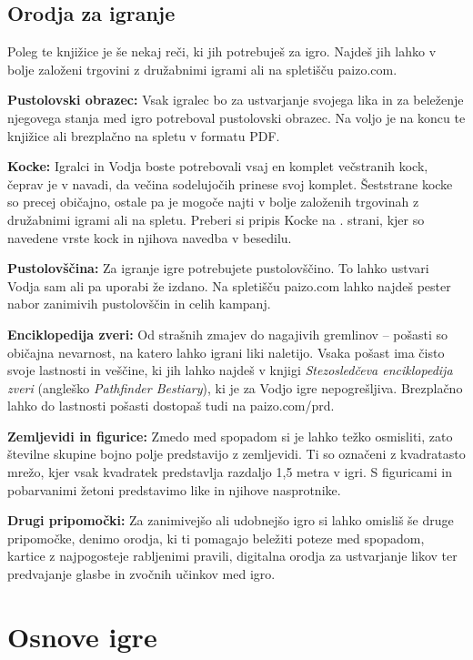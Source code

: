 \subsection{Orodja za igranje}

Poleg te knjižice je še nekaj reči, ki jih potrebuješ za igro. Najdeš jih lahko v bolje založeni trgovini z družabnimi igrami ali na spletišču paizo.com.

\textbf{Pustolovski obrazec:} Vsak igralec bo za ustvarjanje svojega lika in za beleženje njegovega stanja med igro potreboval pustolovski obrazec. Na voljo je na koncu te knjižice ali brezplačno na spletu v formatu PDF.

\textbf{Kocke:} Igralci in Vodja boste potrebovali vsaj en komplet večstranih kock, čeprav je v navadi, da večina sodelujočih prinese svoj komplet. Šeststrane kocke so precej običajno, ostale pa je mogoče najti v bolje založenih trgovinah z družabnimi igrami ali na spletu. Preberi si pripis Kocke na \pageref{sidenote-kocke}. strani, kjer so navedene vrste kock in njihova navedba v besedilu.

\textbf{Pustolovščina:} Za igranje igre potrebujete pustolovščino. To lahko ustvari Vodja sam ali pa uporabi že izdano. Na spletišču paizo.com lahko najdeš pester nabor zanimivih pustolovščin in celih kampanj.

\textbf{Enciklopedija zveri:} Od strašnih zmajev do nagajivih gremlinov -- pošasti so običajna nevarnost, na katero lahko igrani liki naletijo. Vsaka pošast ima čisto svoje lastnosti in veščine, ki jih lahko najdeš v knjigi \textit{Stezosledčeva enciklopedija zveri} (angleško \textit{Pathfinder Bestiary}), ki je za Vodjo igre nepogrešljiva. Brezplačno lahko do lastnosti pošasti dostopaš tudi na paizo.com/prd.

\textbf{Zemljevidi in figurice:} Zmedo med spopadom si je lahko težko osmisliti, zato številne skupine bojno polje predstavijo z zemljevidi. Ti so označeni z kvadratasto mrežo, kjer vsak kvadratek predstavlja razdaljo 1,5 metra v igri. S figuricami in pobarvanimi žetoni predstavimo like in njihove nasprotnike.

\textbf{Drugi pripomočki:} Za zanimivejšo ali udobnejšo igro si lahko omisliš še druge pripomočke, denimo orodja, ki ti pomagajo beležiti poteze med spopadom, kartice z najpogosteje rabljenimi pravili, digitalna orodja za ustvarjanje likov ter predvajanje glasbe in zvočnih učinkov med igro.

\section{Osnove igre}

